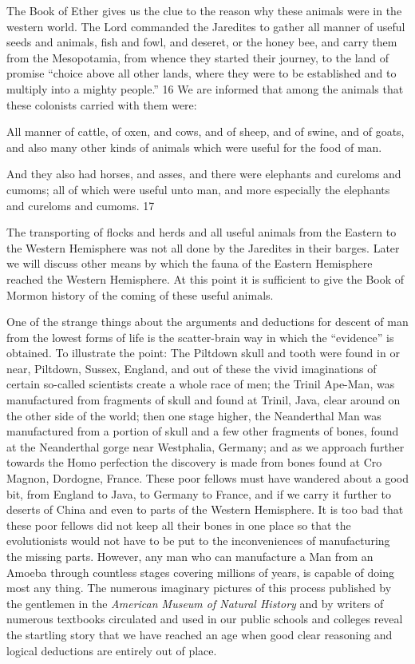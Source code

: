 The Book of Ether gives us the clue to the reason why these animals were in the western
world. The Lord commanded the Jaredites to gather all manner of useful seeds and animals,
fish and fowl, and deseret, or the honey bee, and carry them from the Mesopotamia, from
whence they started their journey, to the land of promise ``choice above all other lands, where
they were to be established and to multiply into a mighty people.'' 16 We are informed that
among the animals that these colonists carried with them were:

All manner of cattle, of oxen, and cows, and of sheep, and of swine, and of goats, and also
many other kinds of animals which were useful for the food of man.

And they also had horses, and asses, and there were elephants and cureloms and cumoms; all
of which were useful unto man, and more especially the elephants and cureloms and
cumoms. 17

The transporting of flocks and herds and all useful animals from the Eastern to the Western
Hemisphere was not all done by the Jaredites in their barges. Later we will discuss other
means by which the fauna of the Eastern Hemisphere reached the Western Hemisphere. At
this point it is sufficient to give the Book of Mormon history of the coming of these useful
animals.

One of the strange things about the arguments and deductions for descent of man from the
lowest forms of life is the scatter-brain way in which the ``evidence'' is obtained. To illustrate
the point: The Piltdown skull and tooth were found in or near, Piltdown, Sussex, England,
and out of these the vivid imaginations of certain so-called scientists create a whole race of
men; the Trinil Ape-Man, was manufactured from fragments of skull and found at Trinil,
Java, clear around on the other side of the world; then one stage higher, the Neanderthal Man
was manufactured from a portion of skull and a few other fragments of bones, found at the
Neanderthal gorge near Westphalia, Germany; and as we approach further towards the Homo
perfection the discovery is made from bones found at Cro Magnon, Dordogne, France. These
poor fellows must have wandered about a good bit, from England to Java, to Germany to
France, and if we carry it further to deserts of China and even to parts of the Western
Hemisphere. It is too bad that these poor fellows did not keep all their bones in one place so
that the evolutionists would not have to be put to the inconveniences of manufacturing the
missing parts. However, any man who can manufacture a Man from an Amoeba through
countless stages covering millions of years, is capable of doing most any thing. The
numerous imaginary pictures of this process published by the gentlemen in the \textit{American
Museum of Natural History} and by writers of numerous textbooks circulated and used in our
public schools and colleges reveal the startling story that we have reached an age when good
clear reasoning and logical deductions are entirely out of place.

